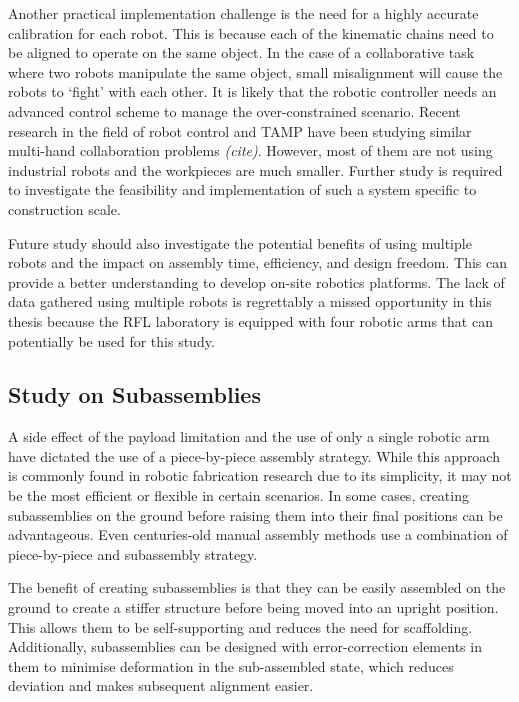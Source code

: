 Another practical implementation challenge is the need for a highly accurate calibration for each robot. This is because each of the kinematic chains need to be aligned to operate on the same object. In the case of a collaborative task where two robots manipulate the same object, small misalignment will cause the robots to ‘fight’ with each other. It is likely that the robotic controller needs an advanced control scheme to manage the over-constrained scenario. Recent research in the field of robot control and TAMP have been studying similar multi-hand collaboration problems \textit{(cite)}. However, most of them are not using industrial robots and the workpieces are much smaller. Further study is required to investigate the feasibility and implementation of such a system specific to construction scale. 

Future study should also investigate the potential benefits of using multiple robots and the impact on assembly time, efficiency, and design freedom. This can provide a better understanding to develop on-site robotics platforms. The lack of data gathered using multiple robots is regrettably a missed opportunity in this thesis because the RFL laboratory is equipped with four robotic arms that can potentially be used for this study. 

\subsection{Study on Subassemblies}
\label{subsection:study-on-subassemblies}

A side effect of the payload limitation and the use of only a single robotic arm have dictated the use of a piece-by-piece assembly strategy. While this approach is commonly found in robotic fabrication research due to its simplicity, it may not be the most efficient or flexible in certain scenarios. In some cases, creating subassemblies on the ground before raising them into their final positions can be advantageous. Even centuries-old manual assembly methods use a combination of piece-by-piece and subassembly strategy.

The benefit of creating subassemblies is that they can be easily assembled on the ground to create a stiffer structure before being moved into an upright position. This allows them to be self-supporting and reduces the need for scaffolding. Additionally, subassemblies can be designed with error-correction elements in them to minimise deformation in the sub-assembled state, which reduces deviation and makes subsequent alignment easier.

